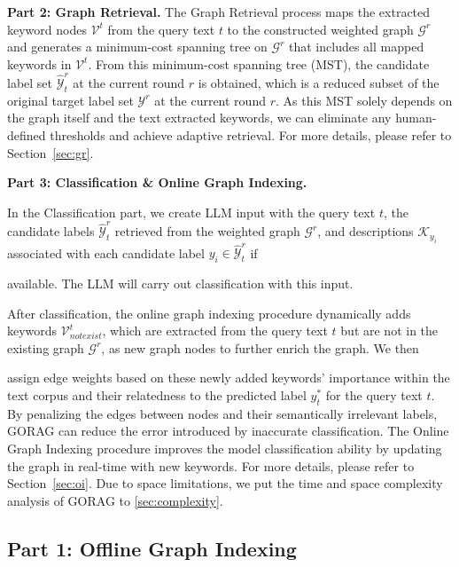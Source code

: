 	
	
	\noindent\textbf{Part 2: Graph Retrieval.} 
	The Graph Retrieval process maps the extracted keyword nodes $\mathcal{V}^t$ from the query text $t$ to the constructed weighted graph $\mathcal{G}^r$ 
	and generates a minimum-cost spanning tree on $\mathcal{G}^r$ that includes all mapped keywords in $\mathcal{V}^t$. 
	From this minimum-cost spanning tree (MST), the candidate label set $\hat{\mathcal{Y}}_t^r$ at the current round $r$ is obtained, 
	which is a reduced subset of the original target label set $\mathcal{Y}^r$ at the current round $r$. 
	As this MST solely depends on the graph itself and the text extracted keywords, we can eliminate any human-defined thresholds and achieve adaptive retrieval. 
	For more details, please  refer to Section~\ref{sec:gr}.
	
	
	
	
	
	\noindent\textbf{Part 3: Classification \& Online Graph Indexing.} 
	
	
	
	In the Classification part, we create LLM input with the query text $t$, the candidate labels $\hat{\mathcal{Y}}_t^r$ retrieved from the weighted graph $\mathcal{G}^r$, and descriptions $\mathcal{K}_{y_i}$ associated with each candidate label $y_i \in \hat{\mathcal{Y}}_t^r$ if 
	
	available. 
	The LLM will carry out classification with this input. 
	
	After classification, the online graph indexing procedure dynamically adds keywords $\mathcal{V}_{notexist}^t$, which are extracted from the query text $t$ but are not in the existing graph $\mathcal{G}^r$, as new graph nodes to further enrich the graph. 
	We then 
	
	assign edge weights based on these newly added keywords' importance within the text corpus and their relatedness to the predicted label $y^*_t$ for the query text $t$.
	By penalizing the edges between nodes and their semantically irrelevant labels, GORAG can reduce the error introduced by inaccurate classification.
	The Online Graph Indexing procedure improves the model classification ability by updating the graph in real-time with new keywords. 
	For more details, please refer to Section~\ref{sec:oi}.
	Due to space limitations, we put the time and space complexity analysis of GORAG to \autoref{sec:complexity}.
	\vspace{-5px}



\subsection{Part 1: Offline Graph Indexing} \label{sec:gc}


